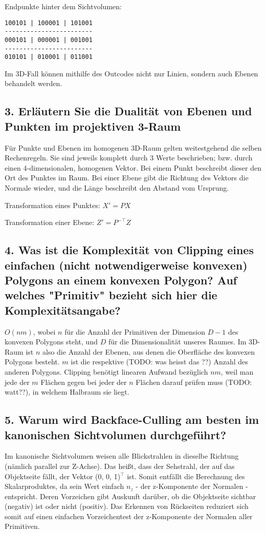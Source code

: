 \documentclass[a4paper,headings=small]{scrartcl}
\numberwithin{equation}{section} %
\numberwithin{figure}{section}   %
\begin{document}
Endpunkte hinter dem Sichtvolumen:
\begin{verbatim}
100101 | 100001 | 101001
------------------------
000101 | 000001 | 001001
------------------------
010101 | 010001 | 011001
\end{verbatim}

Im 3D-Fall können mithilfe des Outcodes nicht nur Linien, sondern auch Ebenen behandelt werden.

\subsection{3. Erläutern Sie die Dualität von Ebenen und Punkten im projektiven 3-Raum}
Für Punkte und Ebenen im homogenen 3D-Raum gelten weitestgehend die selben Rechenregeln. Sie sind jeweils komplett durch 3 Werte beschrieben; bzw. durch einen 4-dimensionalen, homogenen Vektor. Bei einem Punkt beschreibt dieser den Ort des Punktes im Raum. Bei einer Ebene gibt die Richtung des Vektors die Normale wieder, und die Länge beschreibt den Abstand vom Ursprung.

Transformation eines Punktes: $X' = P X$

Transformation einer Ebene: $Z' = P^{-\top} Z$

\subsection{4. Was ist die Komplexität von Clipping eines einfachen (nicht notwendigerweise konvexen) Polygons an einem konvexen Polygon? Auf welches "Primitiv" bezieht sich hier die Komplexitätsangabe?}

$O(n m)$, wobei $n$ für die Anzahl der Primitiven der Dimension $D - 1$ des konvexen Polygons steht, und $D$ für die Dimensionalität unseres Raumes. Im 3D-Raum ist $n$ also die Anzahl der Ebenen,  aus denen die Oberfläche des konvexen Polygons besteht. $m$ ist die respektive (TODO: was heisst das ??) Anzahl des anderen Polygons. Clipping benötigt linearen Aufwand bezüglich $n m$, weil man jede der $m$ Flächen gegen bei jeder der $n$ Flächen darauf prüfen muss (TODO: watt??), in welchem Halbraum sie liegt.

\subsection{5. Warum wird Backface-Culling am besten im kanonischen Sichtvolumen durchgeführt?}

Im kanonische Sichtvolumen weisen alle Blickstrahlen in dieselbe Richtung (nämlich parallel zur Z-Achse).
Das heißt, dass der Sehstrahl, der auf das Objektseite fällt, der Vektor (0, 0, 1)$^{\top}$ ist.
Somit entfällt die Berechnung des Skalarproduktes, da sein Wert einfach $n_z$ - der z-Komponente der Normalen - entspricht.
Deren Vorzeichen gibt Auskunft darüber, ob die Objektseite sichtbar (negativ) ist oder nicht (positiv).
Das Erkennen von Rückseiten reduziert sich somit auf einen einfachen Vorzeichentest der z-Komponente der Normalen aller Primitiven.
\end{document}
